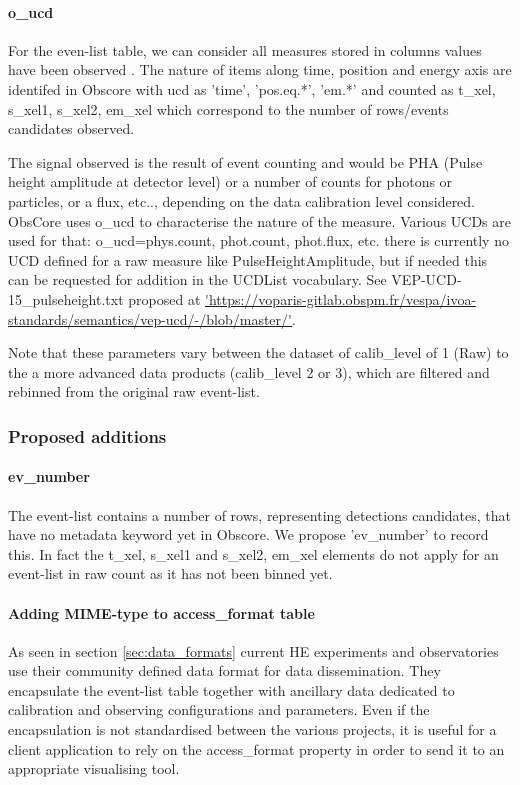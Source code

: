 \documentclass[11pt,a4paper]{ivoa}
\begin{document}
{\paragraph{o\_ucd}
For the even-list table, we can consider all measures stored in columns values have been observed .
The nature of items along time, position and energy axis are identifed in Obscore with ucd as 'time', 'pos.eq.*', 'em.*'
and counted as t\_xel, s\_xel1, s\_xel2, em\_xel which correspond to the number of rows/events candidates observed.

The signal observed is the result of event counting and would be PHA (Pulse height amplitude at detector level) or a number of counts for photons or particles, or a flux, etc.., depending on the data calibration level considered.
ObsCore uses o\_ucd to characterise the nature of the measure.
Various UCDs are used for that: o\_ucd=phys.count, phot.count, phot.flux, etc. there is currently no UCD defined for a raw measure like PulseHeightAmplitude, but if needed this can be requested for addition in the UCDList vocabulary. See VEP-UCD-15\_pulseheight.txt proposed at \url{'https://voparis-gitlab.obspm.fr/vespa/ivoa-standards/semantics/vep-ucd/-/blob/master/'}.

Note that these parameters vary between the dataset of calib\_level of 1 (Raw) to the a more advanced data products (calib\_level 2 or 3), which are filtered and rebinned from the original raw event-list.


\subsubsection{Proposed additions}

\paragraph{ev\_number}
The event-list contains a number of rows, representing detections candidates, that have no metadata keyword yet in Obscore.
We propose 'ev\_number' to record this.
In fact the t\_xel, s\_xel1 and s\_xel2, em\_xel elements do not apply for an event-list in raw count as it has not been binned yet.

\paragraph{Adding MIME-type to access\_format table}
As seen in section \ref{sec:data_formats} current \gls{HE} experiments and observatories use their community defined data format for data dissemination.
They encapsulate the event-list table together with ancillary data dedicated to calibration and observing configurations and parameters.
Even if the encapsulation is not standardised between the various projects, it is useful for a client application to rely on the access\_format property in order to send it to an appropriate visualising tool.

}
\end{document}
